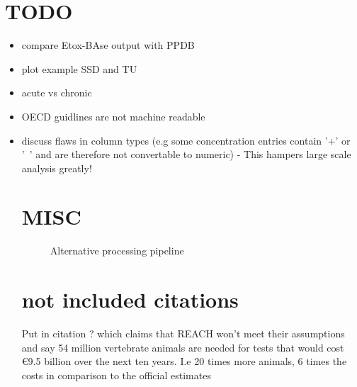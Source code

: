 \documentclass[english]{article}
\begin{document}
\pagebreak
\section*{TODO}

\begin{itemize}

\item compare Etox-BAse output with PPDB

\item plot example SSD and TU

\item acute vs chronic

\item OECD guidlines are not machine readable

\item discuss flaws in column types (e.g some concentration entries contain '+' or '~' and are therefore not convertable to numeric) - This hampers large scale analysis greatly!

\pagebreak
\section*{MISC}

\begin{figure}
    
    \caption{Alternative processing pipeline}
    \label{fig:pipeline-tree}
\end{figure}

\section*{not included citations}
Put in citation \citep{hartung_chemical_2009} ? which claims that REACH won't meet their assumptions and say 54 million vertebrate animals are needed for tests that would cost €9.5 billion over the next ten years. I.e 20 times more animals, 6 times the costs in comparison to the official estimates 


\end{itemize}
\end{document}

